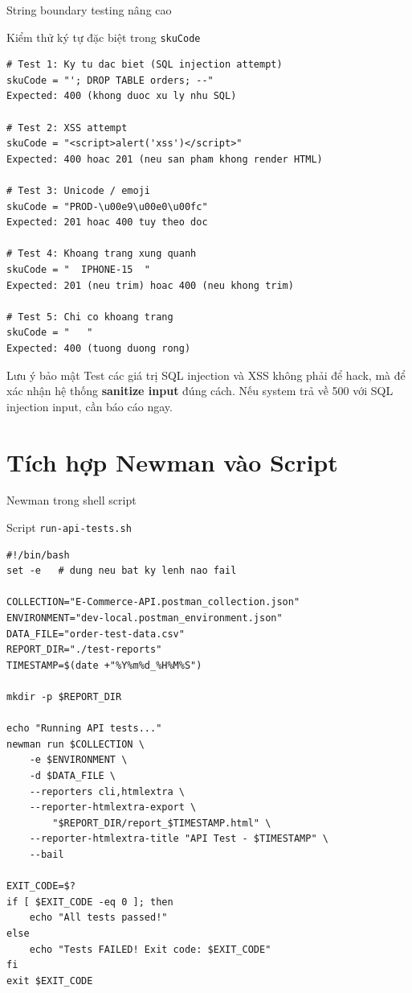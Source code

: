 \documentclass[aspectratio=169,10pt]{beamer}
\begin{document}
\begin{frame}[fragile]{String boundary testing nâng cao}
  \begin{block}{Kiểm thử ký tự đặc biệt trong \texttt{skuCode}}
\begin{lstlisting}[style=bash]
# Test 1: Ky tu dac biet (SQL injection attempt)
skuCode = "'; DROP TABLE orders; --"
Expected: 400 (khong duoc xu ly nhu SQL)

# Test 2: XSS attempt
skuCode = "<script>alert('xss')</script>"
Expected: 400 hoac 201 (neu san pham khong render HTML)

# Test 3: Unicode / emoji
skuCode = "PROD-\u00e9\u00e0\u00fc"
Expected: 201 hoac 400 tuy theo doc

# Test 4: Khoang trang xung quanh
skuCode = "  IPHONE-15  "
Expected: 201 (neu trim) hoac 400 (neu khong trim)

# Test 5: Chi co khoang trang
skuCode = "   "
Expected: 400 (tuong duong rong)
\end{lstlisting}
  \end{block}

  \begin{alertblock}{Lưu ý bảo mật}
    Test các giá trị SQL injection và XSS không phải để hack,
    mà để xác nhận hệ thống \textbf{sanitize input} đúng cách.
    Nếu system trả về 500 với SQL injection input, cần báo cáo ngay.
  \end{alertblock}
\end{frame}

\section{Tích hợp Newman vào Script}

\begin{frame}[fragile]{Newman trong shell script}
  \begin{block}{Script \texttt{run-api-tests.sh}}
\begin{lstlisting}[style=bash]
#!/bin/bash
set -e   # dung neu bat ky lenh nao fail

COLLECTION="E-Commerce-API.postman_collection.json"
ENVIRONMENT="dev-local.postman_environment.json"
DATA_FILE="order-test-data.csv"
REPORT_DIR="./test-reports"
TIMESTAMP=$(date +"%Y%m%d_%H%M%S")

mkdir -p $REPORT_DIR

echo "Running API tests..."
newman run $COLLECTION \
    -e $ENVIRONMENT \
    -d $DATA_FILE \
    --reporters cli,htmlextra \
    --reporter-htmlextra-export \
        "$REPORT_DIR/report_$TIMESTAMP.html" \
    --reporter-htmlextra-title "API Test - $TIMESTAMP" \
    --bail

EXIT_CODE=$?
if [ $EXIT_CODE -eq 0 ]; then
    echo "All tests passed!"
else
    echo "Tests FAILED! Exit code: $EXIT_CODE"
fi
exit $EXIT_CODE
\end{lstlisting}
  \end{block}
\end{frame}
\end{document}
